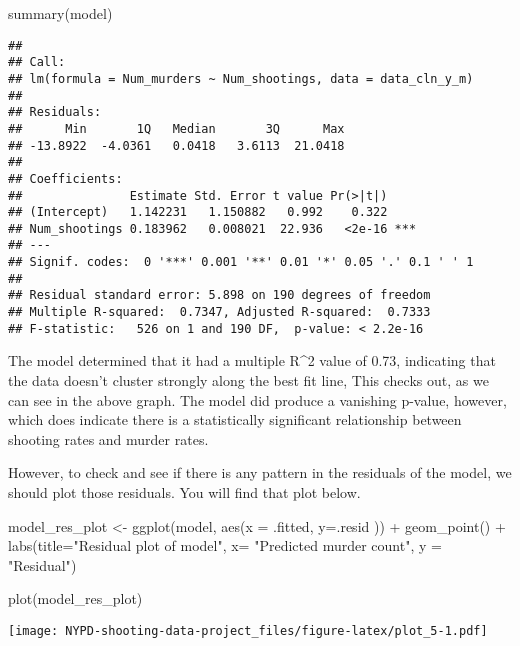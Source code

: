 \documentclass[
]{article}
\newenvironment{Shaded}{\begin{snugshade}}{\end{snugshade}}
\newcommand{\AttributeTok}[1]{\textcolor[rgb]{0.77,0.63,0.00}{#1}}
\newcommand{\FunctionTok}[1]{\textcolor[rgb]{0.00,0.00,0.00}{#1}}
\newcommand{\NormalTok}[1]{#1}
\newcommand{\OtherTok}[1]{\textcolor[rgb]{0.56,0.35,0.01}{#1}}
\newcommand{\SpecialCharTok}[1]{\textcolor[rgb]{0.00,0.00,0.00}{#1}}
\newcommand{\StringTok}[1]{\textcolor[rgb]{0.31,0.60,0.02}{#1}}
\begin{document}
\begin{Shaded}
\begin{Highlighting}[]
\FunctionTok{summary}\NormalTok{(model)}
\end{Highlighting}
\end{Shaded}

\begin{verbatim}
## 
## Call:
## lm(formula = Num_murders ~ Num_shootings, data = data_cln_y_m)
## 
## Residuals:
##      Min       1Q   Median       3Q      Max 
## -13.8922  -4.0361   0.0418   3.6113  21.0418 
## 
## Coefficients:
##               Estimate Std. Error t value Pr(>|t|)    
## (Intercept)   1.142231   1.150882   0.992    0.322    
## Num_shootings 0.183962   0.008021  22.936   <2e-16 ***
## ---
## Signif. codes:  0 '***' 0.001 '**' 0.01 '*' 0.05 '.' 0.1 ' ' 1
## 
## Residual standard error: 5.898 on 190 degrees of freedom
## Multiple R-squared:  0.7347, Adjusted R-squared:  0.7333 
## F-statistic:   526 on 1 and 190 DF,  p-value: < 2.2e-16
\end{verbatim}

The model determined that it had a multiple R\^{}2 value of 0.73,
indicating that the data doesn't cluster strongly along the best fit
line, This checks out, as we can see in the above graph. The model did
produce a vanishing p-value, however, which does indicate there is a
statistically significant relationship between shooting rates and murder
rates.

However, to check and see if there is any pattern in the residuals of
the model, we should plot those residuals. You will find that plot
below.

\begin{Shaded}
\begin{Highlighting}[]
\NormalTok{model\_res\_plot }\OtherTok{\textless{}{-}} \FunctionTok{ggplot}\NormalTok{(model, }\FunctionTok{aes}\NormalTok{(}\AttributeTok{x =}\NormalTok{ .fitted, }\AttributeTok{y=}\NormalTok{.resid )) }\SpecialCharTok{+} \FunctionTok{geom\_point}\NormalTok{() }\SpecialCharTok{+} \FunctionTok{labs}\NormalTok{(}\AttributeTok{title=}\StringTok{"Residual plot of model"}\NormalTok{, }\AttributeTok{x=} \StringTok{"Predicted murder count"}\NormalTok{, }\AttributeTok{y =} \StringTok{"Residual"}\NormalTok{)}

\FunctionTok{plot}\NormalTok{(model\_res\_plot)}
\end{Highlighting}
\end{Shaded}

\texttt{[image: NYPD-shooting-data-project\_files/figure-latex/plot\_5-1.pdf]}
\end{document}
